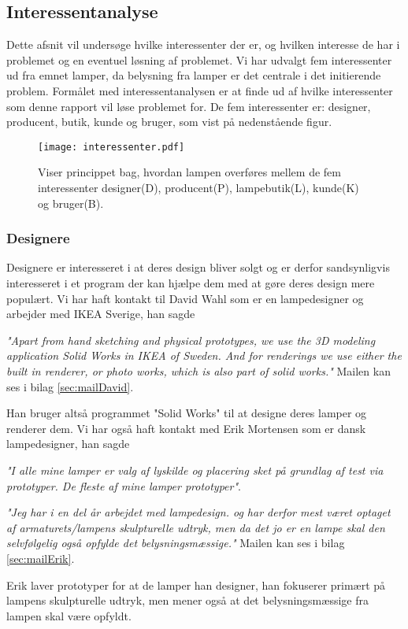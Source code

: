 \subsection{Interessentanalyse}
Dette afsnit vil undersøge hvilke interessenter der er, og hvilken interesse de har i problemet og en eventuel løsning af problemet. Vi har udvalgt fem interessenter ud fra emnet lamper, da belysning fra lamper er det centrale i det initierende problem. Formålet med interessentanalysen er at finde ud af hvilke interessenter som denne rapport vil løse problemet for. De fem interessenter er: designer, producent, butik, kunde og bruger, som vist på nedenstående figur.

\begin{figure}[H]
	\center\texttt{[image: interessenter.pdf]}
	\center\caption{Viser princippet bag, hvordan lampen overføres mellem de fem interessenter designer(D), producent(P), lampebutik(L), kunde(K) og bruger(B).}
    \label{fig:interessenter}
\end{figure}

\subsubsection{Designere}
Designere er interesseret i at deres design bliver solgt og er derfor sandsynligvis interesseret i et program der kan hjælpe dem med at gøre deres design mere populært.
Vi har haft kontakt til David Wahl som er en lampedesigner og arbejder med IKEA Sverige, han sagde 
\begin{center}
\textit{"Apart from hand sketching and physical prototypes, we use the 3D modeling application Solid Works in IKEA of Sweden. And for renderings we use either the built in renderer, or photo works, which is also part of solid works."} Mailen kan ses i bilag \ref{sec:mailDavid}.
\end{center}
Han bruger altså programmet "Solid Works"\cite{SolidWorks} til at designe deres lamper og renderer dem.
Vi har også haft kontakt med Erik Mortensen som er dansk lampedesigner, han sagde 
\begin{center}
\textit{"I alle mine lamper er valg af lyskilde og placering sket på grundlag af test via prototyper. De fleste af mine lamper prototyper"}.

\textit{"Jeg har i en del år arbejdet med lampedesign. og har derfor mest været optaget af armaturets/lampens skulpturelle udtryk, men da det jo er en lampe skal den selvfølgelig  også opfylde det belysningsmæssige."} Mailen kan ses i bilag \ref{sec:mailErik}.
\end{center}
 Erik laver prototyper for at de lamper han designer, han fokuserer primært på lampens skulpturelle udtryk, men mener også at det belysningsmæssige fra lampen skal være opfyldt. 

